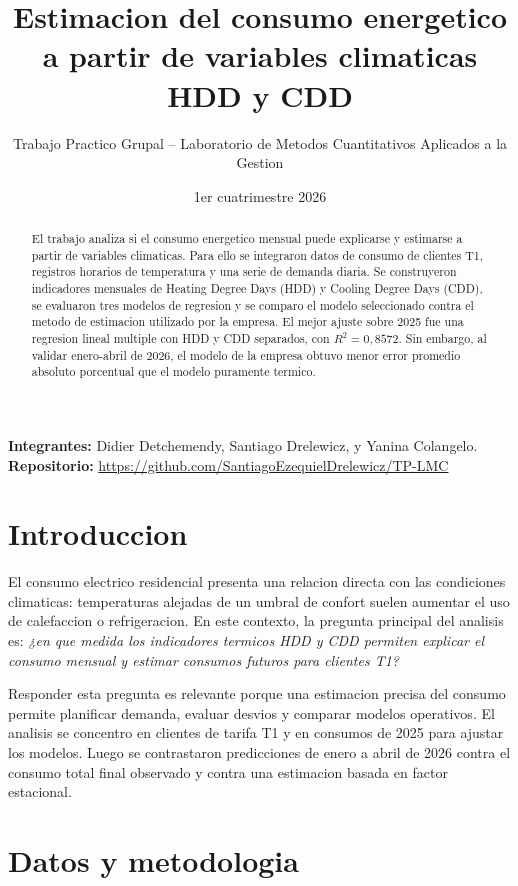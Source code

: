 \documentclass[11pt,a4paper]{article}
\title{\textbf{Estimacion del consumo energetico a partir de variables climaticas HDD y CDD}}
\author{Trabajo Practico Grupal -- Laboratorio de Metodos Cuantitativos Aplicados a la Gestion}
\date{1er cuatrimestre 2026}
\begin{document}
\maketitle

\begin{center}
\textbf{Integrantes:} Didier Detchemendy, Santiago Drelewicz, y Yanina Colangelo.\\
\textbf{Repositorio:} \url{https://github.com/SantiagoEzequielDrelewicz/TP-LMC}
\end{center}

\begin{abstract}
El trabajo analiza si el consumo energetico mensual puede explicarse y estimarse a partir de variables climaticas. Para ello se integraron datos de consumo de clientes T1, registros horarios de temperatura y una serie de demanda diaria. Se construyeron indicadores mensuales de Heating Degree Days (HDD) y Cooling Degree Days (CDD), se evaluaron tres modelos de regresion y se comparo el modelo seleccionado contra el metodo de estimacion utilizado por la empresa. El mejor ajuste sobre 2025 fue una regresion lineal multiple con HDD y CDD separados, con $R^2=0{,}8572$. Sin embargo, al validar enero-abril de 2026, el modelo de la empresa obtuvo menor error promedio absoluto porcentual que el modelo puramente termico.
\end{abstract}

\section{Introduccion}

El consumo electrico residencial presenta una relacion directa con las condiciones climaticas: temperaturas alejadas de un umbral de confort suelen aumentar el uso de calefaccion o refrigeracion. En este contexto, la pregunta principal del analisis es: \textit{¿en que medida los indicadores termicos HDD y CDD permiten explicar el consumo mensual y estimar consumos futuros para clientes T1?}

Responder esta pregunta es relevante porque una estimacion precisa del consumo permite planificar demanda, evaluar desvios y comparar modelos operativos. El analisis se concentro en clientes de tarifa T1 y en consumos de 2025 para ajustar los modelos. Luego se contrastaron predicciones de enero a abril de 2026 contra el consumo total final observado y contra una estimacion basada en factor estacional.

\section{Datos y metodologia}
\end{document}
